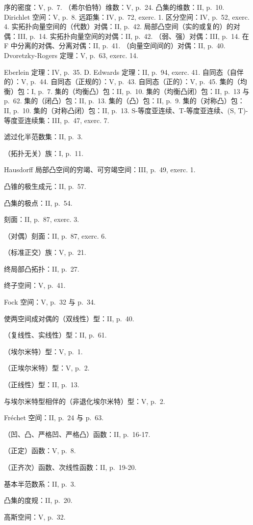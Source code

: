 序的密度：V, p.~7. （希尔伯特）维数：V, p.~24. 凸集的维数：II, p.~10. Dirichlet 空间：V, p.~8. 远距集：IV, p.~72, exerc. 1. 区分空间：IV, p.~52, exerc. 4. 实拓扑向量空间的（代数）对偶：II, p.~42. 局部凸空间（实的或复的）的对偶：III, p.~14. 实拓扑向量空间的对偶：II, p.~42. （弱、强）对偶：III, p.~14. 在 F 中分离的对偶、分离对偶：II, p.~41. （向量空间间的）对偶：II, p.~40. Dvoretzky-Rogers 定理：V, p.~63, exerc. 14.

Eberlein 定理：IV, p.~35. D. Edwards 定理：II, p.~94, exerc. 41. 自同态（自伴的）：V, p.~44. 自同态（正规的）：V, p.~43. 自同态（正的）：V, p.~45. 集的（均衡）包：I, p.~7. 集的（均衡凸）包：II, p.~10. 集的（均衡凸闭）包：II, p.~13 与 p.~62. 集的（闭凸）包：II, p.~13. 集的（凸）包：II, p.~9. 集的（对称凸）包：II, p.~10. 集的（对称凸闭）包：II, p.~13. S-等度亚连续、T-等度亚连续、(S, T)-等度亚连续集：III, p.~47, exerc. 7.

滤过化半范数集：II, p.~3.

（拓扑无关）族：I, p.~11.

Hausdorff 局部凸空间的穷竭、可穷竭空间：III, p.~49, exerc. 1.

凸锥的极生成元：II, p.~57.

凸集的极点：II, p.~54.

刻面：II, p.~87, exerc. 3.

（对偶）刻面：II, p.~87, exerc. 6.

（标准正交）族：V, p.~21.

终局部凸拓扑：II, p.~27.

终子空间：V, p.~41.

Fock 空间：V, p.~32 与 p.~34.

使两空间成对偶的（双线性）型：II, p.~40.

（复线性、实线性）型：II, p.~61.

（埃尔米特）型：V, p.~1.

（正埃尔米特）型：V, p.~2.

（正线性）型：II, p.~13.

与埃尔米特型相伴的（非退化埃尔米特）型：V, p.~2.

Fréchet 空间：II, p.~24 与 p.~63.

（凹、凸、严格凹、严格凸）函数：II, p.~16-17.

（正定）函数：V, p.~8.

（正齐次）函数、次线性函数：II, p.~19-20.

基本半范数系：II, p.~3.

凸集的度规：II, p.~20.

高斯空间：V, p.~32.

